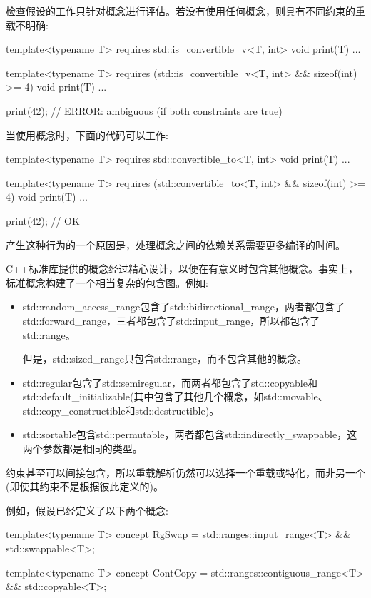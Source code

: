 检查假设的工作只针对概念进行评估。若没有使用任何概念，则具有不同约束的重载不明确:

\begin{cpp}
template<typename T>
requires std::is_convertible_v<T, int>
void print(T) {
	...
}

template<typename T>
requires (std::is_convertible_v<T, int> && sizeof(int) >= 4)
void print(T) {
	...
}

print(42); // ERROR: ambiguous (if both constraints are true)
\end{cpp}

当使用概念时，下面的代码可以工作:

\begin{cpp}
template<typename T>
requires std::convertible_to<T, int>
void print(T) {
	...
}

template<typename T>
requires (std::convertible_to<T, int> && sizeof(int) >= 4)
void print(T) {
	...
}

print(42); // OK
\end{cpp}

产生这种行为的一个原因是，处理概念之间的依赖关系需要更多编译的时间。

C++标准库提供的概念经过精心设计，以便在有意义时包含其他概念。事实上，标准概念构建了一个相当复杂的包含图。例如:

\begin{itemize}
\item
std::random\_access\_range包含了std::bidirectional\_range，两者都包含了std::forward\_range，三者都包含了std::input\_range，所以都包含了std::range。

但是，std::sized\_range只包含std::range，而不包含其他的概念。

\item
std::regular包含了std::semiregular，而两者都包含了std::copyable和std::default\_initializable(其中包含了其他几个概念，如std::movable、std::copy\_constructible和std::destructible)。

\item
std::sortable包含std::permutable，两者都包含std::indirectly\_swappable，这两个参数都是相同的类型。
\end{itemize}


约束甚至可以间接包含，所以重载解析仍然可以选择一个重载或特化，而非另一个(即使其约束不是根据彼此定义的)。

例如，假设已经定义了以下两个概念:

\begin{cpp}
template<typename T>
concept RgSwap = std::ranges::input_range<T> && std::swappable<T>;

template<typename T>
concept ContCopy = std::ranges::contiguous_range<T> && std::copyable<T>;
\end{cpp}

